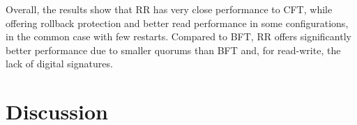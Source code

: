 Overall, the results show that \ac{RR} has very close performance
to \ac{CFT}, while offering rollback protection and better read performance
in some configurations, in the common case with few restarts.
Compared to \ac{BFT}, \ac{RR} offers significantly better performance
due to smaller quorums than \ac{BFT} and, for read-write, the lack of
digital signatures.

\section{Discussion}\label{sec:discution}

